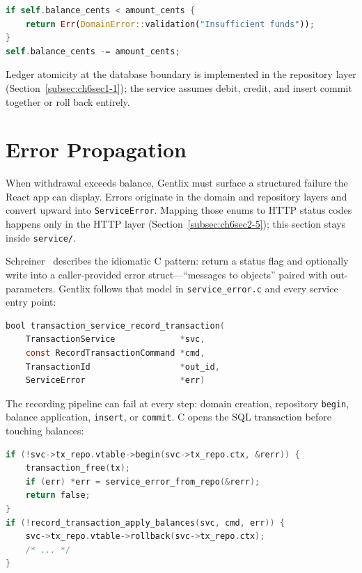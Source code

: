 \begin{lstlisting}[language=Rust, caption={account.rs (domain) --- Same invariant
inside \texttt{Account::debit}.}]
if self.balance_cents < amount_cents {
    return Err(DomainError::validation("Insufficient funds"));
}
self.balance_cents -= amount_cents;
\end{lstlisting}

Ledger atomicity at the database boundary is implemented in the repository layer
(Section~\ref{subsec:ch6sec1-1}); the service assumes debit, credit, and insert commit
together or roll back entirely.

\section{Error Propagation}
\label{sec:ch5sec2}

When withdrawal exceeds balance, Gentlix must surface a structured failure the React app
can display. Errors originate in the domain and repository layers and convert upward into
\texttt{ServiceError}. Mapping those enums to HTTP status codes happens only in the HTTP
layer (Section~\ref{subsec:ch6sec2-5}); this section stays inside \texttt{service/}.

Schreiner~\cite{Schreiner1993} describes the idiomatic C pattern: return a status flag
and optionally write into a caller-provided error struct---``messages to objects'' paired
with out-parameters. Gentlix follows that model in \texttt{service\_error.c} and every
service entry point:

\begin{lstlisting}[language=C, caption={transaction\_service.c --- The C service
returns \texttt{bool} and optionally fills \texttt{ServiceError *err}.}]
bool transaction_service_record_transaction(
    TransactionService             *svc,
    const RecordTransactionCommand *cmd,
    TransactionId                  *out_id,
    ServiceError                   *err)
\end{lstlisting}

The recording pipeline can fail at every step: domain creation, repository
\texttt{begin}, balance application, \texttt{insert}, or \texttt{commit}. C opens the
SQL transaction before touching balances:

\begin{lstlisting}[language=C, caption={transaction\_service.c --- \texttt{begin}
pairs balance updates and insert in one DB transaction.}]
if (!svc->tx_repo.vtable->begin(svc->tx_repo.ctx, &rerr)) {
    transaction_free(tx);
    if (err) *err = service_error_from_repo(&rerr);
    return false;
}
if (!record_transaction_apply_balances(svc, cmd, err)) {
    svc->tx_repo.vtable->rollback(svc->tx_repo.ctx);
    /* ... */
}
\end{lstlisting}

